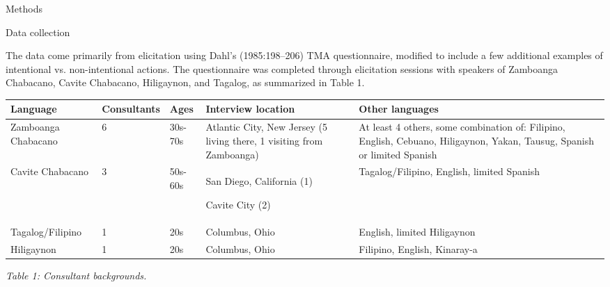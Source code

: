 \setcounter{listWWNumiiileveli}{0}
\begin{listWWNumiiileveli}
\item 
\begin{stylelsSectioni}
Methods
\end{stylelsSectioni}


\setcounter{listWWNumiiilevelii}{0}
\begin{listWWNumiiilevelii}
\item 
\begin{stylelsSectionii}
Data collection
\end{stylelsSectionii}
\end{listWWNumiiilevelii}
\end{listWWNumiiileveli}
\begin{styleStandard}
The data come primarily from elicitation using Dahl's (1985:198–206) TMA questionnaire, modified to include a few additional examples of intentional vs. non-intentional actions. The questionnaire was completed through elicitation sessions with speakers of Zamboanga Chabacano, Cavite Chabacano, Hiligaynon, and Tagalog, as summarized in Table 1.
\end{styleStandard}

\begin{flushleft}
\tablefirsthead{}
\tablehead{}
\tabletail{}
\tablelasttail{}
\begin{supertabular}{|m{1.0038599in}|m{0.78165984in}|m{0.44835988in}|m{1.1976599in}|m{1.1622599in}|}
\hline
\textbf{Language} &
\textbf{Consultants} &
\textbf{Ages} &
\textbf{Interview location} &
\textbf{Other languages}\\\hline
Zamboanga Chabacano &
6 &
30s-70s &
Atlantic City, New Jersey (5 living there, 1 visiting from Zamboanga) &
At least 4 others, some combination of: Filipino, English, Cebuano, Hiligaynon, Yakan, Tausug, Spanish or limited Spanish\\\hline
Cavite Chabacano &
3 &
50s-60s &
San Diego, California (1)

Cavite City (2) &
Tagalog/Filipino, English, limited Spanish\\\hline
Tagalog/Filipino &
1 &
20s &
Columbus, Ohio &
English, limited Hiligaynon\\\hline
Hiligaynon &
1 &
20s &
Columbus, Ohio &
Filipino, English, Kinaray-a\\\hline
\end{supertabular}
\end{flushleft}
\begin{styleStandard}
\textit{Table 1: Consultant backgrounds.}
\end{styleStandard}

